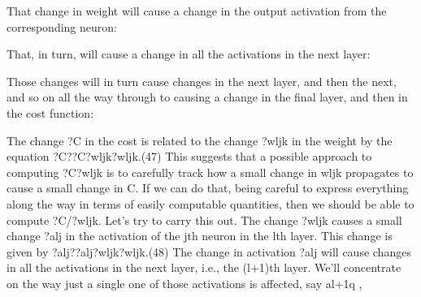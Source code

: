 That change in weight will cause a change in the output activation from the corresponding neuron: 

That, in turn, will cause a change in all the activations in the next layer: 

Those changes will in turn cause changes in the next layer, and then the next, and so on all the way through to causing a change in the final layer, and then in the cost function: 

The change ?C in the cost is related to the change ?wljk in the weight by the equation 
?C??C?wljk?wljk.(47)
This suggests that a possible approach to computing ?C?wljk is to carefully track how a small change in wljk propagates to cause a small change in C. If we can do that, being careful to express everything along the way in terms of easily computable quantities, then we should be able to compute ?C/?wljk.
Let's try to carry this out. The change ?wljk
causes a small change ?alj in the activation of the jth neuron in the lth layer. This change is given by 
?alj??alj?wljk?wljk.(48)
The change in activation ?alj will cause changes in all the activations in the next layer, i.e., the (l+1)th layer. We'll concentrate on the way just a single one of those activations is affected, say al+1q
, 

